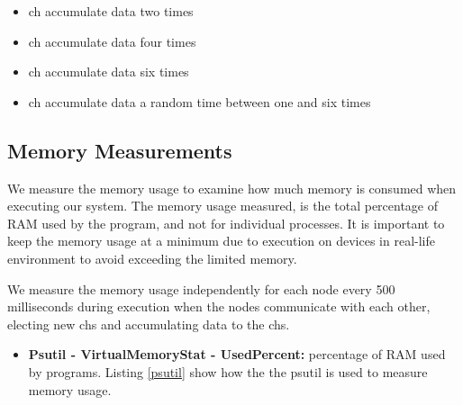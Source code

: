 \documentclass[USenglish]{uit-thesis}
\begin{document}
\begin{itemize}
\item \gls{ch} accumulate data two times
\item \gls{ch} accumulate data four times
\item \gls{ch} accumulate data six times
\item \gls{ch} accumulate data a random time between one and six times
\end{itemize}



\subsection{Memory Measurements} \label{eva:mem_measure}
We measure the memory usage to examine how much memory is consumed when executing our system. The memory usage measured, is the total percentage of RAM used by the program, and not for individual processes. It is important to keep the memory usage at a minimum due to execution on devices in real-life environment to avoid exceeding the limited memory.


We measure the memory usage independently for each node every 500 milliseconds during execution when the nodes communicate with each other, electing new \glspl{ch} and accumulating data to the \glspl{ch}.



\begin{itemize}
\item \textbf{Psutil - VirtualMemoryStat - UsedPercent:} percentage of RAM used by programs. Listing \ref{psutil} show how the the psutil is used to measure memory usage.
\end{itemize}

\newpage
\end{document}
